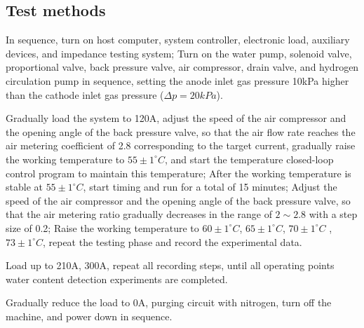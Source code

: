 \subsection*{Test methods}
In sequence, turn on host computer, system controller, electronic load, auxiliary devices, and impedance testing system; Turn on the water pump, solenoid valve, proportional valve, back pressure valve, air compressor, drain valve, and hydrogen circulation pump in sequence, setting the anode inlet gas pressure 10kPa higher than the cathode inlet gas pressure ($\Delta p=20kPa$).
\par
Gradually load the system to 120A, adjust the speed of the air compressor and the opening angle of the back pressure valve, so that the air flow rate reaches the air metering coefficient of 2.8 corresponding to the target current, gradually raise the working temperature to $55\pm1^{\circ}C$, and start the temperature closed-loop control program to maintain this temperature; After the working temperature is stable at $55\pm1^{\circ}C$, start timing and run for a total of 15 minutes; Adjust the speed of the air compressor and the opening angle of the back pressure valve, so that the air metering ratio gradually decreases in the range of $2 \sim 2.8$ with a step size of 0.2; Raise the working temperature to $60\pm1^{\circ}C$, $65\pm1^{\circ}C$, $70\pm1^{\circ}C$ , $73\pm1^{\circ}C$, repeat the testing phase and record the experimental data.
\par
Load up to 210A, 300A, repeat all recording steps, until all operating points water content detection experiments are completed.
\par
Gradually reduce the load to 0A, purging circuit with nitrogen, turn off the machine, and power down in sequence.

